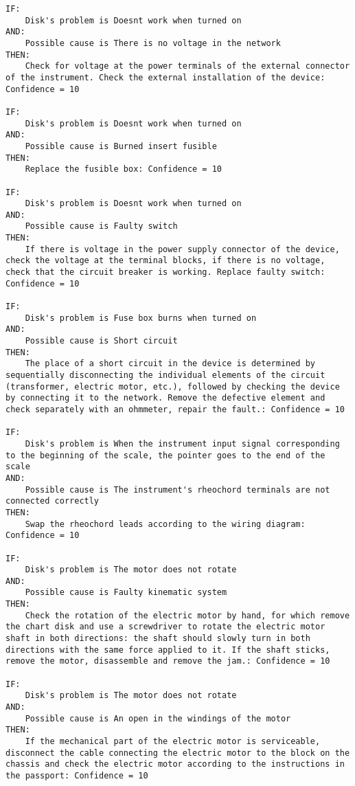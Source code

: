 \begin{lstlisting}[caption={Алгоритм работы ЭС}]
IF:
	Disk's problem is Doesnt work when turned on
AND:
	Possible cause is There is no voltage in the network
THEN:
	Check for voltage at the power terminals of the external connector of the instrument. Check the external installation of the device: Confidence = 10

IF:
	Disk's problem is Doesnt work when turned on
AND:
	Possible cause is Burned insert fusible
THEN:
	Replace the fusible box: Confidence = 10

IF:
	Disk's problem is Doesnt work when turned on
AND:
	Possible cause is Faulty switch
THEN:
	If there is voltage in the power supply connector of the device, check the voltage at the terminal blocks, if there is no voltage, check that the circuit breaker is working. Replace faulty switch: Confidence = 10

IF:
	Disk's problem is Fuse box burns when turned on
AND:
	Possible cause is Short circuit
THEN:
	The place of a short circuit in the device is determined by sequentially disconnecting the individual elements of the circuit (transformer, electric motor, etc.), followed by checking the device by connecting it to the network. Remove the defective element and check separately with an ohmmeter, repair the fault.: Confidence = 10

IF:
	Disk's problem is When the instrument input signal corresponding to the beginning of the scale, the pointer goes to the end of the scale
AND:
	Possible cause is The instrument's rheochord terminals are not connected correctly
THEN:
	Swap the rheochord leads according to the wiring diagram: Confidence = 10

IF:
	Disk's problem is The motor does not rotate
AND:
	Possible cause is Faulty kinematic system
THEN:
	Check the rotation of the electric motor by hand, for which remove the chart disk and use a screwdriver to rotate the electric motor shaft in both directions: the shaft should slowly turn in both directions with the same force applied to it. If the shaft sticks, remove the motor, disassemble and remove the jam.: Confidence = 10

IF:
	Disk's problem is The motor does not rotate
AND:
	Possible cause is An open in the windings of the motor
THEN:
	If the mechanical part of the electric motor is serviceable, disconnect the cable connecting the electric motor to the block on the chassis and check the electric motor according to the instructions in the passport: Confidence = 10


\end{lstlisting}
